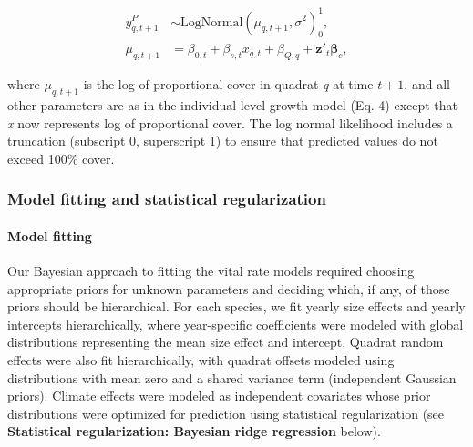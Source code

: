 \documentclass[12pt,]{article}
\begin{document}
\vspace{-3em}\begin{align}
y_{q,t+1}^{P} &\sim \text{LogNormal}(\mu_{q,t+1}, \sigma^2)_{0}^{1}, \\
\mu_{q,t+1} &= \beta_{0,t} + \beta_{s,t}x_{q,t} + \beta_{Q,q} + \textbf{z}'_t \boldsymbol{\beta}_c,
\end{align}\vspace{-3em}

where \(\mu_{q,t+1}\) is the log of proportional cover in quadrat
\emph{q} at time \(t+1\), and all other parameters are as in the
individual-level growth model (Eq. 4) except that \emph{x} now
represents log of proportional cover. The log normal likelihood includes
a truncation (subscript 0, superscript 1) to ensure that predicted
values do not exceed 100\% cover.

\subsubsection{Model fitting and statistical
regularization}\label{model-fitting-and-statistical-regularization}

\paragraph{Model fitting}\label{model-fitting}

Our Bayesian approach to fitting the vital rate models required choosing
appropriate priors for unknown parameters and deciding which, if any, of
those priors should be hierarchical. For each species, we fit yearly
size effects and yearly intercepts hierarchically, where year-specific
coefficients were modeled with global distributions representing the
mean size effect and intercept. Quadrat random effects were also fit
hierarchically, with quadrat offsets modeled using distributions with
mean zero and a shared variance term (independent Gaussian priors).
Climate effects were modeled as independent covariates whose prior
distributions were optimized for prediction using statistical
regularization (see \textbf{Statistical regularization: Bayesian ridge
regression} below).
\end{document}
